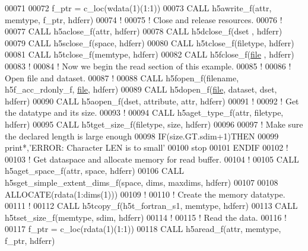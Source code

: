 \begin{DoxyCode}
00071 
00072   f\_ptr = c\_loc(wdata(1)(1:1))
00073   \textcolor{keyword}{CALL }h5awrite\_f(attr, memtype, f\_ptr, hdferr)
00074   \textcolor{comment}{!}
00075   \textcolor{comment}{! Close and release resources.}
00076   \textcolor{comment}{!}
00077   \textcolor{keyword}{CALL }h5aclose\_f(attr, hdferr)
00078   \textcolor{keyword}{CALL }h5dclose\_f(dset , hdferr)
00079   \textcolor{keyword}{CALL }h5sclose\_f(space, hdferr)
00080   \textcolor{keyword}{CALL }h5tclose\_f(filetype, hdferr)
00081   \textcolor{keyword}{CALL }h5tclose\_f(memtype, hdferr)
00082   \textcolor{keyword}{CALL }h5fclose\_f(\hyperlink{structfile}{file} , hdferr)
00083   \textcolor{comment}{!}
00084   \textcolor{comment}{! Now we begin the read section of this example.}
00085   \textcolor{comment}{!}
00086   \textcolor{comment}{! Open file and dataset.}
00087   \textcolor{comment}{!}
00088   \textcolor{keyword}{CALL }h5fopen\_f(filename, h5f\_acc\_rdonly\_f, \hyperlink{structfile}{file}, hdferr)
00089   \textcolor{keyword}{CALL }h5dopen\_f(\hyperlink{structfile}{file}, dataset, dset, hdferr)
00090   \textcolor{keyword}{CALL }h5aopen\_f(dset, attribute, attr, hdferr)
00091   \textcolor{comment}{!}
00092   \textcolor{comment}{! Get the datatype and its size.}
00093   \textcolor{comment}{!}
00094   \textcolor{keyword}{CALL }h5aget\_type\_f(attr, filetype, hdferr)
00095   \textcolor{keyword}{CALL }h5tget\_size\_f(filetype, \textcolor{keyword}{size}, hdferr)
00096 
00097   \textcolor{comment}{! Make sure the declared length is large enough}
00098   \textcolor{keywordflow}{IF}(size.GT.sdim+1)\textcolor{keywordflow}{THEN}
00099      print*,\textcolor{stringliteral}{'ERROR: Character LEN is to small'}
00100      stop
00101 \textcolor{keywordflow}{  ENDIF}
00102   \textcolor{comment}{!}
00103   \textcolor{comment}{! Get dataspace and allocate memory for read buffer.}
00104   \textcolor{comment}{! }
00105   \textcolor{keyword}{CALL }h5aget\_space\_f(attr, space, hdferr)
00106   \textcolor{keyword}{CALL }h5sget\_simple\_extent\_dims\_f(space, dims, maxdims, hdferr)
00107 
00108   \textcolor{keyword}{ALLOCATE}(rdata(1:dims(1)))
00109   \textcolor{comment}{!}
00110   \textcolor{comment}{! Create the memory datatype.}
00111   \textcolor{comment}{!}
00112   \textcolor{keyword}{CALL }h5tcopy\_f(h5t\_fortran\_s1, memtype, hdferr)
00113   \textcolor{keyword}{CALL }h5tset\_size\_f(memtype, sdim, hdferr)
00114   \textcolor{comment}{!}
00115   \textcolor{comment}{! Read the data.}
00116   \textcolor{comment}{!}
00117   f\_ptr = c\_loc(rdata(1)(1:1))
00118   \textcolor{keyword}{CALL }h5aread\_f(attr, memtype, f\_ptr, hdferr)

\end{DoxyCode}
